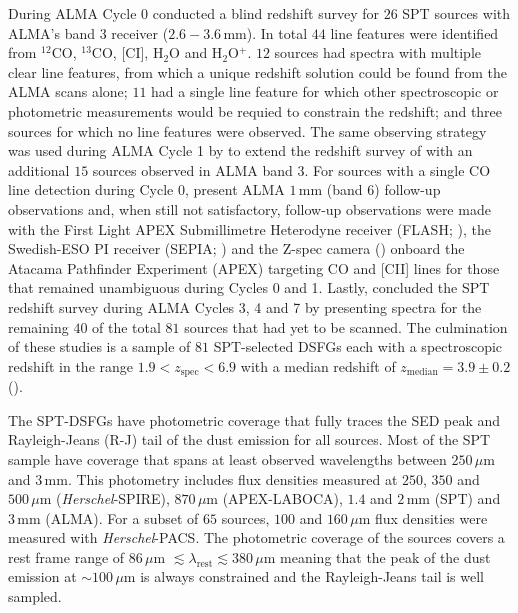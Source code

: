During ALMA Cycle 0 \citealt{Weiss_2013} conducted a blind redshift survey for $26$ SPT sources with ALMA's band 3 receiver ($2.6 - 3.6\,$mm). In total $44$ line features were identified from $^{12}$CO, $^{13}$CO, [CI], H$_2$O and H$_2$O$^+$. $12$ sources had spectra with multiple clear line features, from which a unique redshift solution could be found from the ALMA scans alone; $11$ had a single line feature for which other spectroscopic or photometric measurements would be requied to constrain the redshift; and three sources for which no line features were observed. The same observing strategy was used during ALMA Cycle 1 by \citealt{Strandet_2016} to extend the redshift survey of \citealt{Weiss_2013} with an additional $15$ sources observed in ALMA band 3. For sources with a single CO line detection during Cycle 0, \citealt{Strandet_2016} present ALMA $1\,$mm (band 6) follow-up observations and, when still not satisfactory, follow-up observations were made with the First Light APEX Submillimetre Heterodyne receiver (FLASH; \citealt{Heyminck_2006}), the Swedish-ESO PI receiver (SEPIA; \citealt{Billade_2012}) and the Z-spec camera (\citealt{Naylor_2003}) onboard the Atacama Pathfinder Experiment (APEX) targeting CO and [CII] lines for those that remained unambiguous during Cycles 0 and 1. Lastly, \citealt{Reuter_2020} concluded the SPT redshift survey during ALMA Cycles 3, 4 and 7 by presenting spectra for the remaining $40$ of the total $81$ sources that had yet to be scanned. The culmination of these studies is a sample of $81$ SPT-selected DSFGs each with a spectroscopic redshift in the range $1.9 < z_{\textrm{spec}} < 6.9$ with a median redshift of $z_{\textrm{median}} = 3.9\pm0.2$ (\citealt{Reuter_2020}).

The SPT-DSFGs have photometric coverage that fully traces the SED peak and Rayleigh-Jeans (R-J) tail of the dust emission for all sources. Most of the SPT sample have coverage that spans at least observed wavelengths between $250\,\mu$m and $3\,$mm. This photometry includes flux densities measured at $250$, $350$ and $500\,\mu$m (\textit{Herschel}-SPIRE), $870\,\mu$m (APEX-LABOCA), $1.4$ and $2\,$mm (SPT) and $3\,$mm (ALMA). For a subset of $65$ sources, $100$ and $160\,\mu$m flux densities were measured with \textit{Herschel}-PACS. The photometric coverage of the sources covers a rest frame range of $86\,\mu$m $\lesssim \lambda_{\textrm{rest}} \lesssim 380\,\mu$m meaning that the peak of the dust emission at $\sim 100\,\mu$m is always constrained and the Rayleigh-Jeans tail is well sampled.

